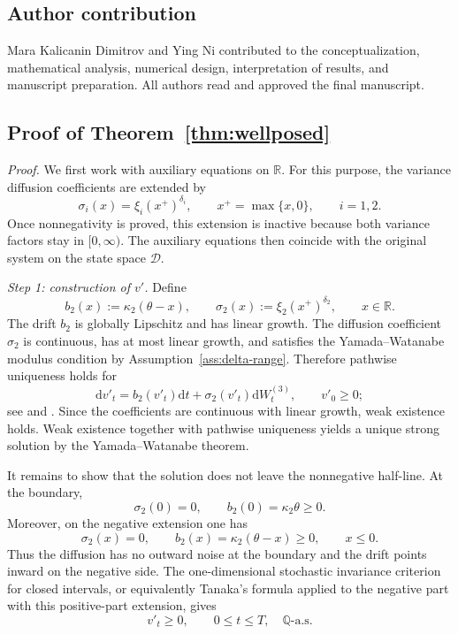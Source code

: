 \documentclass[pdflatex,sn-mathphys-num]{sn-jnl}
\theoremstyle{thmstyleone}%
\theoremstyle{thmstylethree}%
\theoremstyle{thmstyletwo}%
\newcommand{\dd}{\mathrm d}
\newcommand{\Q}{\mathbb Q}
\newcommand{\R}{\mathbb R}
\begin{document}
\subsection*{Author contribution}
Mara Kalicanin Dimitrov and Ying Ni contributed to the conceptualization, mathematical analysis, numerical design, interpretation of results, and manuscript preparation. All authors read and approved the final manuscript.
\begin{appendices}

\section{Proof of Theorem~\ref{thm:wellposed}}\label{app:proof-wellposed}

\noindent\textit{Proof.}
We first work with auxiliary equations on $\R$. For this purpose, the variance
diffusion coefficients are extended by
$$
\sigma_i(x)=\xi_i(x^+)^{\delta_i},\qquad
x^+=\max\{x,0\},\qquad i=1,2.
$$
Once nonnegativity is proved, this extension is inactive because both variance
factors stay in $[0,\infty)$. The auxiliary equations then coincide with the
original system on the state space $\mathcal D$.

\emph{Step 1: construction of $v'$.}
Define
$$
b_2(x):=\kappa_2(\theta-x),\qquad
\sigma_2(x):=\xi_2(x^+)^{\delta_2},\qquad x\in\R.
$$
The drift $b_2$ is globally Lipschitz and has linear growth. The diffusion
coefficient $\sigma_2$ is continuous, has at most linear growth, and satisfies
the Yamada--Watanabe modulus condition by Assumption~\ref{ass:delta-range}.
Therefore pathwise uniqueness holds for
$$
\dd v'_t=b_2(v'_t)\dd t+\sigma_2(v'_t)\dd W^{(3)}_t,
\qquad v'_0\ge0;
$$
see \cite{yamada1971uniqueness} and \cite[Ch.~5]{karatzas1991brownian}. Since
the coefficients are continuous with linear growth, weak existence holds. Weak
existence together with pathwise uniqueness yields a unique strong solution by
the Yamada--Watanabe theorem.

It remains to show that the solution does not leave the nonnegative half-line.
At the boundary,
$$
\sigma_2(0)=0,\qquad b_2(0)=\kappa_2\theta\ge0.
$$
Moreover, on the negative extension one has
$$
\sigma_2(x)=0,\qquad b_2(x)=\kappa_2(\theta-x)\ge0,\qquad x\le0.
$$
Thus the diffusion has no outward noise at the boundary and the drift points
inward on the negative side. The one-dimensional stochastic invariance
criterion for closed intervals, or equivalently Tanaka's formula applied to the
negative part with this positive-part extension, gives
$$
v'_t\ge0,\qquad 0\le t\le T,\quad \Q\text{-a.s.}
$$


\end{appendices}
\end{document}
